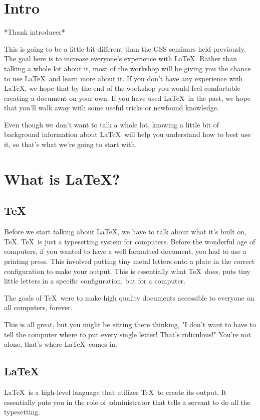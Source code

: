 \documentclass[12pt]{article}
\begin{document}
\maketitle

\section{Intro}
	*Thank introducer*
	
	This is going to be a little bit different than the GSS
	seminars held previously. The goal here is to increase 
	everyone's experience with \LaTeX. Rather than talking
	a whole lot about it, most of the workshop will be 
	giving you the chance to use \LaTeX\ and learn more about
	it. If you don't have any experience with \LaTeX, we 
	hope that by the end of the workshop you would feel
	comfortable creating a document on your own. If you 
	have used \LaTeX\ in the past, we hope that you'll walk
	away with some useful tricks or newfound knowledge.

	Even though we don't want to talk a whole lot, knowing
	a little bit of background information about \LaTeX\
	will help you understand how to best use it, so that's
	what we're going to start with. 
\section{What is \LaTeX?}
\subsection{\TeX}
	Before we start talking about \LaTeX, we have to talk 
	about what it's built on, \TeX. \TeX\ is just a
	typesetting system for computers. Before the wonderful 
	age of computers, if you 
	wanted to have a well formatted document, you had to
	use a printing press. This involved putting tiny metal 
	letters onto a plate in the correct configuration to 
	make your output. This is essentially what \TeX\ does,
	puts tiny little letters in a specific configuration,
	but for a computer. 

	The goals of \TeX\ were to make high quality documents 
	accessible to everyone on all computers, forever.

	This is all great, but you might be sitting there
	thinking, "I don't want to have to tell the computer
	where to put every single letter! That's ridiculous!"
	You're not alone, that's where LaTeX\ comes in.
\subsection{\LaTeX}
	\LaTeX\ is a high-level language that utilizes \TeX\
	to create its output. It essentially puts you in the
	role of administrator that tells a servant to do 
	all the typesetting.
\end{document}

